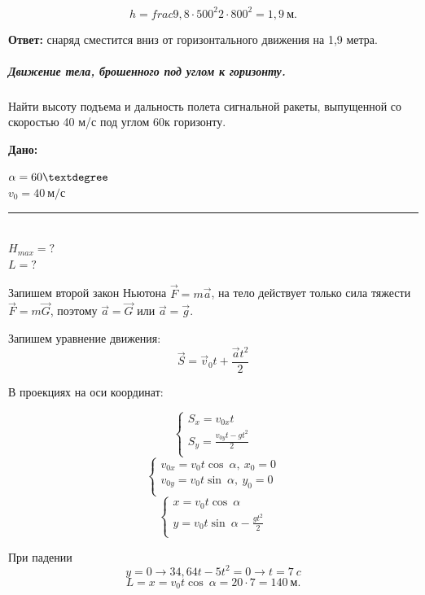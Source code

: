 \documentclass[a5paper, 10pt]{diss_4}
\newcommand{\TNF}{$\vec{F}=m\vec{a}$}
\renewcommand{\'}{\,'}
\newcommand{\UDV}{\vec{S}=\vec{v}_0t+\frac{\vec{a}t^2}{2}}
\begin{document}
\[
h=frac{9,8\cdot500^2}{2\cdot800^2}=1,9\ м.
\]

\textbf{Ответ:} снаряд сместится вниз от горизонтального движения на 1,9 метра.


\subparagraph{Движение тела, брошенного под углом к горизонту.}

Найти высоту подъема и дальность полета сигнальной ракеты, выпущенной со скоростью 40 м/с  под углом  60\textdegree  к горизонту.

\hspace{1cm}\textbf{Дано:}\hspace{.3cm}
\parbox[t]{4cm}{
$\alpha=60\textdegree$\\
$v_0 = 40\ м/с$\\
\rule{4cm}{.4pt}\\
$H_{max} = ?$\\
$L = ?$
}


Запишем второй закон Ньютона \TNF, на тело действует только сила тяжести $\vec{F}=m\vec{G}$, поэтому $\vec{a}=\vec{G}$
или $\vec{a}=\vec{g}$.

Запишем уравнение движения:
\[
\UDV
\]

В проекциях на оси координат:

\begin{equation*}
     \left\{
          \begin{array}{lr}
 S_x=v_{0x}t\\
 S_y=\frac{v_{0y}t-gt^2}{2}\\
          \end{array}
     \right.
\end{equation*}
\begin{equation*}
     \left\{
          \begin{array}{lr}
v_{0x}=v_0t\cos\ \alpha,\ x_0=0\\
v_{0y}=v_0t\sin\ \alpha,\ y_0=0\\
          \end{array}
     \right.
\end{equation*}
\begin{equation*}
     \left\{
          \begin{array}{lr}
x=v_0t\cos\ \alpha\\
y=v_0t\sin\ \alpha-\frac{gt^2}{2}\\
          \end{array}
     \right.
\end{equation*}

При падении
\[
y=0\to
34,64t-5t^2=0\to
t=7\ c
\]
\[
L=x=v_0t\cos\ \alpha=20\cdot7=140\ м.
\]
\end{document}
